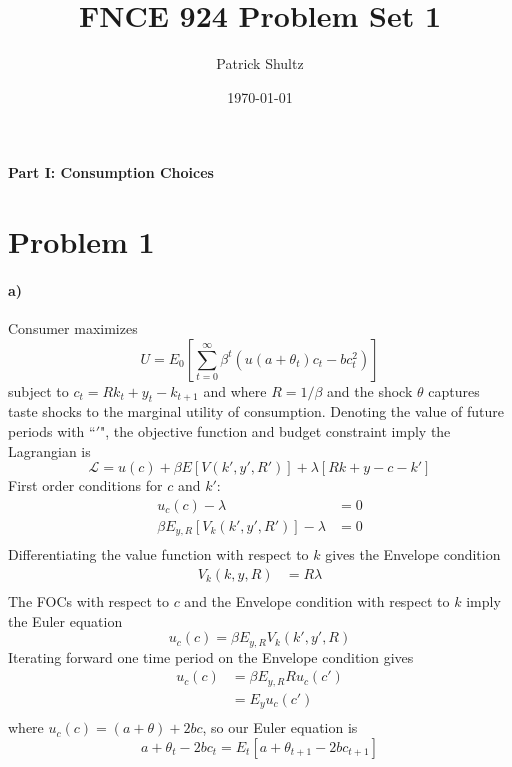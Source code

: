 \documentclass[11pt,letter]{article}
\begin{document}
\title{FNCE 924 Problem Set 1}
\author{Patrick Shultz }
\date{\today}
\maketitle 
\noindent\large\textbf{Part I: Consumption Choices}
\section*{Problem 1}
\paragraph{a)}
Consumer maximizes
\begin{equation*}
	U = E_0\left[ \sum_{t = 0}^{\infty} \beta^t( u(a+ \theta_t)c_t - bc_t^2)\right] 
\end{equation*}
subject to $c_t = Rk_t + y_t - k_{t+1}$ and where $R = 1/\beta$ and the shock $\theta$ captures taste shocks to the marginal utility of consumption. Denoting the value of future periods with ``$'$", the objective function and budget constraint imply the Lagrangian is
\begin{equation*}
	\mathcal{L} = u(c) +\beta E\left[V(k', y', R') \right] + \lambda \left[Rk + y - c-k' \right]  
\end{equation*}
First order conditions for $c$ and $k'$:
\begin{equation*}
	\begin{split}
	 u_c(c) - \lambda &=0\\
	\beta E_{y, R}\left[ V_k(k', y', R')\right]-\lambda &= 0\\
	\end{split}
\end{equation*}
Differentiating the value function with respect to $k$ gives the Envelope condition
\begin{equation*}
\begin{split}
V_k(k, y, R) &= R\lambda\\  
\end{split}
\end{equation*}
The FOCs with respect to $c$ and the Envelope condition with respect to $k$ imply the Euler equation 
\begin{equation*}
	u_c(c) = \beta E_{y, R} V_k(k', y', R)
\end{equation*}
Iterating forward one time period on the Envelope condition gives
\begin{equation*}
\begin{split}
u_c(c) &= \beta E_{y, R} R u_c(c')\\
&= E_{y} u_c(c')\\
\end{split}
\end{equation*}
where $u_c(c) = (a+\theta) + 2bc$, so our Euler equation is 
\begin{equation}
a + \theta_t - 2bc_t = E_t\left[a + \theta_{t+1} -2bc_{t+1} \right]  
\end{equation}
\end{document}

